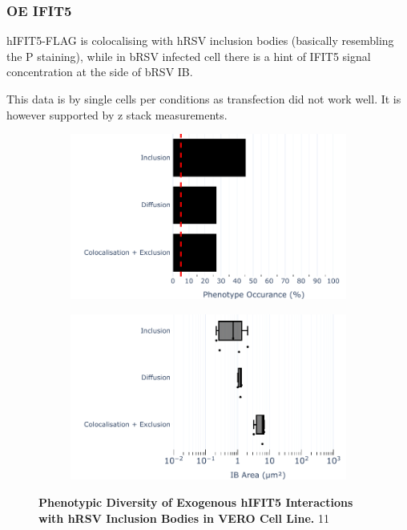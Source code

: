 \subsubsection{OE IFIT5}
hIFIT5-FLAG is colocalising with hRSV inclusion bodies (basically resembling the P staining), while in bRSV infected cell there is a hint of IFIT5 signal concentration at the side of bRSV IB.

This data is by single cells per conditions as transfection did not work well. It is however supported by z stack measurements.

\begin{figure}
    \begin{subfigure}{0.495\textwidth}
        \caption{}
        \includegraphics[width=1\linewidth]{09. Chapter 4/Figs/04. Overexpression/03. IFIT5/01. bar_i5_hrsv.pdf} 
    \end{subfigure}
    \begin{subfigure}{0.495\textwidth}
        \caption{}
        \includegraphics[width=1\linewidth]{09. Chapter 4/Figs/04. Overexpression/03. IFIT5/02. box_i5_hrsv.pdf}
    \end{subfigure}
    \caption[Phenotypic Diversity of Exogenous hIFIT5 Interactions with hRSV Inclusion Bodies in VERO Cell Line.]{\textbf{Phenotypic Diversity of Exogenous hIFIT5 Interactions with hRSV Inclusion Bodies in VERO Cell Line.} 11}
    \label{fig:Phenotypic Diversity of Exogenous hIFIT5 Interactions with hRSV Inclusion Bodies in VERO Cell Line}
\end{figure}

